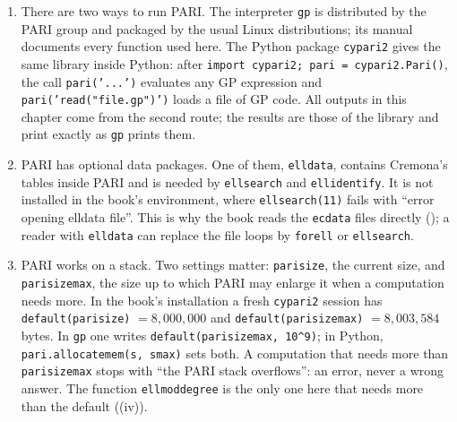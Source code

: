 \begin{sloppypar}
\begin{remark}\label{rem:computation:install}
\begin{enumerate}[label=(\roman*)]
\item There are two ways to run PARI. The interpreter \texttt{gp} is distributed by the PARI group \cite{PARI} and packaged by the usual
Linux distributions; its manual \cite{PARIusers} documents every function used here. The Python package \texttt{cypari2} \cite{cypari2}
gives the same library inside Python: after \texttt{import cypari2; pari = cypari2.Pari()}, the call \texttt{pari('...')} evaluates any GP
expression and \texttt{pari('read("file.gp")')} loads a file of GP code. All outputs in this chapter come from the second route; the
results are those of the library and print exactly as \texttt{gp} prints them.
\item PARI has optional data packages. One of them, \texttt{elldata}, contains Cremona's tables inside PARI and is needed by
\texttt{ellsearch} and \texttt{ellidentify}. It is not installed in the book's environment, where \texttt{ellsearch(11)} fails with ``error
opening elldata file''. This is why the book reads the \texttt{ecdata} files directly (); a reader with
\texttt{elldata} can replace the file loops by \texttt{forell} or \texttt{ellsearch}.
\item PARI works on a stack. Two settings matter: \texttt{parisize}, the current size, and \texttt{parisizemax}, the size up to which PARI may
enlarge it when a computation needs more. In the book's installation a fresh \texttt{cypari2} session has \texttt{default(parisize)}
$=8{,}000{,}000$ and \texttt{default(parisizemax)} $=8{,}003{,}584$ bytes. In \texttt{gp} one writes \texttt{default(parisizemax, 10\^{}9)}; in
Python, \texttt{pari.allocatemem(s, smax)} sets both. A computation that needs more than \texttt{parisizemax} stops with ``the PARI stack
overflows'': an error, never a wrong answer. The function \texttt{ellmoddegree} is the only one here that needs more than the default
((iv)).
\end{enumerate}
\end{remark}


\end{sloppypar}
